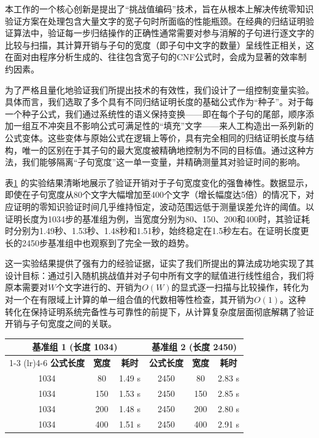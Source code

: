 本工作的一个核心创新是提出了“挑战值编码”技术，旨在从根本上解决传统零知识验证方案在处理包含大量文字的宽子句时所面临的性能瓶颈。在经典的归结证明验证算法中，验证每一步归结操作的正确性通常需要对参与消解的子句进行逐文字的比较与扫描，其计算开销与子句的宽度（即子句中文字的数量）呈线性正相关，这在面对由程序分析生成的、往往包含宽子句的CNF公式时，会成为显著的效率制约因素。

为了严格且量化地验证我们所提出技术的有效性，我们设计了一组控制变量实验。具体而言，我们选取了多个具有不同归结证明长度的基础公式作为“种子”。对于每一个种子公式，我们通过系统性的语义保持变换——即在每个子句的尾部，顺序添加一组互不冲突且不影响公式可满足性的“填充”文字——来人工构造出一系列新的公式变体。这些变体与原始公式在逻辑上等价，具有完全相同的归结证明长度与结构，唯一的区别在于其子句的最大宽度被精确地控制为不同的目标值。通过这种方法，我们能够隔离“子句宽度”这一单一变量，并精确测量其对验证时间的影响。

表\ref{tab:width-independence} 的实验结果清晰地展示了验证开销对于子句宽度变化的强鲁棒性。数据显示，即使在子句宽度从80个文字大幅增加至400个文字（增长幅度达5倍）的情况下，对应证明的零知识验证时间几乎维持恒定，波动范围远低于测量误差允许的阈值。以证明长度为1034步的基准组为例，当宽度分别为80、150、200和400时，其验证耗时分别为1.49秒、1.53秒、1.48秒和1.51秒，始终稳定在1.5秒左右。在证明长度更长的2450步基准组中也观察到了完全一致的趋势。

这一实验结果提供了强有力的经验证据，证实了我们所提出的算法成功地实现了其设计目标：通过引入随机挑战值并对子句中所有文字的赋值进行线性组合，我们将原本需要对$W$个文字进行的、开销为$O(W)$的显式逐一扫描与比较操作，转化为对一个在有限域上计算的单一组合值的代数相等性检查，其开销为$O(1)$。这种转化在保持证明系统完备性与可靠性的前提下，从计算复杂度层面彻底解耦了验证开销与子句宽度之间的关联。

\begin{table}[htbp]
\centering
{}
\label{tab:width-independence}
\begin{tabular}{cccccc}
\toprule
\multicolumn{3}{c}{\textbf{基准组 1 (长度 1034)}} & \multicolumn{3}{c}{\textbf{基准组 2 (长度 2450)}} \\
\cmidrule(lr){1-3} \cmidrule(lr){4-6}
\textbf{公式长度} & \textbf{宽度} & \textbf{耗时} & \textbf{公式长度} & \textbf{宽度} & \textbf{耗时} \\
\midrule
1034 & 80 & 1.49 s & 2450 & 80 & 2.83 s \\
1034 & 150 & 1.53 s & 2450 & 150 & 2.85 s \\
1034 & 200 & 1.48 s & 2450 & 200 & 2.80 s \\
1034 & 400 & 1.51 s & 2450 & 400 & 2.91 s \\
\bottomrule
\end{tabular}
\end{table}

